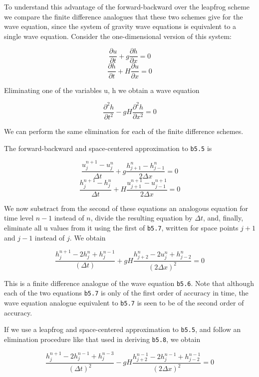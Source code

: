 To understand this advantage of the forward-backward over the leapfrog
scheme we compare the finite difference analogues that these two schemes
give for the wave equation, since the system of gravity wave equations
is equivalent to a single wave equation. Consider the one-dimensional
version of this system:

\[\frac{\partial u}{\partial t} + g\frac{\partial h}{\partial x} = 0\]\[\frac{\partial h}{\partial t} + H\frac{\partial u}{\partial x} = 0\]

Eliminating one of the variables u, h we obtain a wave equation

\[\frac{\partial^{2} h}{\partial t^{2}} - gH\frac{\partial^{2} h}{\partial x^{2}} = 0\]

We can perform the same elimination for each of the finite difference
schemes.

The forward-backward and space-centered approximation to \texttt{b5.5}
is

\[\frac{u_j^{n + 1} - u_j^n}{\Delta t} + g\frac{h_{j + 1}^{n} - h_{j - 1}^{n}}{2\Delta x} = 0\]\[\frac{h_j^{n + 1} - h_j^n}{\Delta t} + H\frac{u_{j + 1}^{n + 1} - u_{j - 1}^{n + 1}}{2\Delta x} = 0\]

We now substract from the second of these equations an analogous
equation for time level \(n - 1\) instead of \(n\), divide the resulting
equation by \(\Delta t\), and, finally, eliminate all u values from it
using the first of \texttt{b5.7}, written for space points \(j + 1\) and
\(j - 1\) instead of \(j\). We obtain

\[\frac{h_{j}^{n + 1} - 2h_{j}^{n} + h_{j}^{n - 1}}{\left( \Delta t \right)}
+ gH\frac{h_{j + 2}^{n} - 2u_j^{n} + h_{j - 2}^{n}}{\left( 2\Delta x \right)^{2}} = 0\]

This is a finite difference analogue of the wave equation \texttt{b5.6}.
Note that although each of the two equations \texttt{b5.7} is only of
the first order of accuracy in time, the wave equation analogue
equivalent to \texttt{b5.7} is seen to be of the second order of
accuracy.

If we use a leapfrog and space-centered approximation to \texttt{b5.5},
and follow an elimination procedure like that used in deriving
\texttt{b5.8}, we obtain

\[\frac{h_j^{n + 1} - 2h_ j^{n - 1} + h_j^{n - 3}}{\left( \Delta t \right)^{2}}
- gH\frac{h_{j + 2}^{n - 1} - 2h_j^{n - 1} + h_{j - 2}^{n - 1}}{\left( 2\Delta x \right)^{2}} = 0\]

